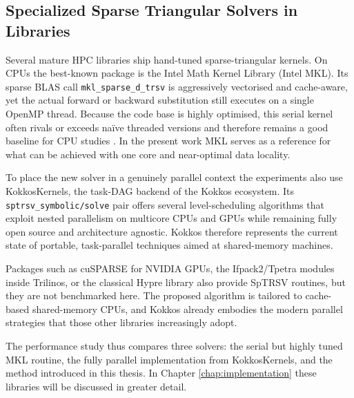 \subsection{Specialized Sparse Triangular Solvers in Libraries}
Several mature HPC libraries ship hand-tuned sparse-triangular kernels.  
On CPUs the best-known package is the Intel Math Kernel Library (Intel MKL).  
Its sparse BLAS call \texttt{mkl\_sparse\_d\_trsv} is aggressively vectorised and cache-aware, yet the actual forward or backward substitution still executes on a single OpenMP thread.  
Because the code base is highly optimised, this serial kernel often rivals or exceeds naïve threaded versions and therefore remains a good baseline for CPU studies \cite{carvalho2015performance}.  
In the present work MKL serves as a reference for what can be achieved with one core and near-optimal data locality.

To place the new solver in a genuinely parallel context the experiments also use KokkosKernels, the task-DAG backend of the Kokkos ecosystem.  Its \texttt{sptrsv\_symbolic/solve} pair offers several level-scheduling algorithms that exploit nested parallelism on multicore CPUs and GPUs while remaining fully open source and architecture agnostic.  
Kokkos therefore represents the current state of portable, task-parallel techniques aimed at shared-memory machines.

Packages such as cuSPARSE for NVIDIA GPUs, the Ifpack2/Tpetra modules inside Trilinos, or the classical Hypre library also provide SpTRSV routines, but they are not benchmarked here.  
The proposed algorithm is tailored to cache-based shared-memory CPUs, and Kokkos already embodies the modern parallel strategies that those other libraries increasingly adopt.

The performance study thus compares three solvers: the serial but highly tuned MKL routine, the fully parallel implementation from KokkosKernels, and the method introduced in this thesis.  In Chapter \ref{chap:implementation} these libraries will be discussed in greater detail.

